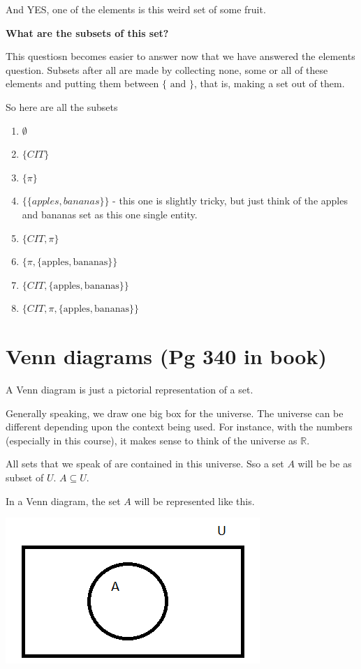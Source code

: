 \documentclass[12pt]{article}
\begin{document}
And YES, one of the elements is this weird set of some fruit.

\medskip

\textbf{What are the subsets of this set?}

This questiosn becomes easier to answer now that we have answered the elements question. Subsets after all are made by collecting none, some or all of these elements and putting them between $\{ \text{ and } \}$, that is, making a set out of them.

So here are all the subsets
\begin{enumerate}
\item $\emptyset$
\item $\{CIT\}$
\item $\{\pi\}$
\item $\{\{apples, bananas\}\}$ - this one is slightly tricky, but just think of the apples and bananas set as this one single entity.
\item $\{CIT, \pi\}$
\item $\{\pi, \{\text{apples}, \text{bananas} \} \}$
\item $\{CIT, \{\text{apples}, \text{bananas} \} \}$
\item $\{CIT, \pi , \{\text{apples}, \text{bananas} \} \}$
\end{enumerate}


\section*{Venn diagrams (Pg 340 in book)}

A Venn diagram is just a pictorial representation of a set.

Generally speaking, we draw one big box for the universe. The universe can be different depending upon the context being used. For instance, with the numbers (especially in this course), it makes sense to think of the universe as $\mathbb{R}$.

All sets that we speak of are contained in this universe. Sso a set $A$ will be 
be as subset of $U$. $ A \subseteq U$.

In a Venn diagram, the set $A$ will be represented like this.

\includegraphics{BasicVenn.png}
\end{document}
